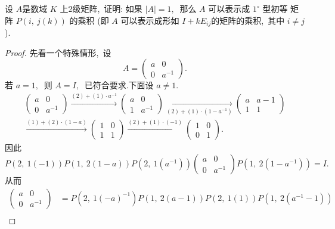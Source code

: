 \newpage
\begin{problem}
	设 $ A  $是数域  $K $ 上$ 2$级矩阵,\  证明: 如果  $|A|=1 ,\ $ 那么  $A$  可以表示成  $1^{\circ} $ 型初等 矩阵  $P(i,\  j(k)) $ 的乘积 (即 $ A $ 可以表示成形如  $I+k E_{i j}  $的矩阵的乘积,\  其中  $i \neq j $ ).
\end{problem}
\begin{proof}
	先看一个特殊情形,\  设
	$$A=\left(\begin{array}{cc}
		a & 0 \\
		0 & a^{-1}
	\end{array}\right) .$$
	若 $ a=1 ,\ $ 则 $ A=I ,\ $ 已符合要求.下面设 $ a \neq 1 .$
	$$\begin{array}{c}
		\left(\begin{array}{cc}
			a & 0 \\
			0 & a^{-1}
		\end{array}\right) \xrightarrow{(2)+(1) \cdot a^{-1}}
		\left(\begin{array}{cc}
			a & 0 \\
			1 & a^{-1}
		\end{array}\right) \xrightarrow[(2)+(1)\cdot\left(1-a^{-1}\right)]{}
		\left(\begin{array}{cc}
			a & a-1 \\
			1 & 1
		\end{array}\right) \\
		\xrightarrow{(1)+(2) \cdot(1-a)}\left(\begin{array}{ll}
			1 & 0 \\
			1 & 1
		\end{array}\right) \xrightarrow{(2)+(1)\cdot(-1)}\left(\begin{array}{ll}
			1 & 0 \\
			0 & 1
		\end{array}\right) .
	\end{array}$$
	因此
	$$P(2,\ 1(-1)) P(1,\ 2(1-a)) P\left(2,\ 1\left(a^{-1}\right)\right)\left(\begin{array}{cc}
		a & 0 \\
		0 & a^{-1}
	\end{array}\right) P\left(1,\ 2\left(1-a^{-1}\right)\right)=I .$$
	从而
	$$\begin{aligned}
		\left(\begin{array}{cc}
			a & 0 \\
			0 & a^{-1}
		\end{array}\right) & =P\left(2,\ 1(-a)^{-1}\right) P(1,\ 2(a-1)) P(2,\ 1(1)) P\left(1,\ 2\left(a^{-1}-1\right)\right) \\

\end{aligned}$$
\end{proof}
